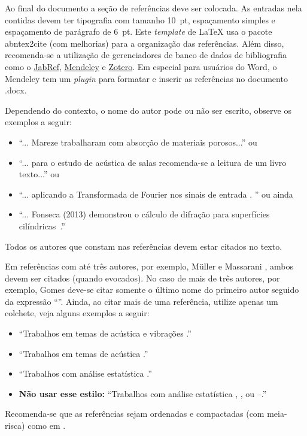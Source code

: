 \documentclass[12pt, a4paper, twoside, onecolumn]{article}
\begin{document}
Ao final do documento a seção de referências deve ser colocada. As entradas nela contidas devem ter tipografia com tamanho 10~pt, espaçamento simples e espaçamento de parágrafo de 6~pt. Este \textit{template} de \LaTeX\xspace usa o pacote {\ttfamily abntex2cite} (com melhorias) para a organização das referências. Além disso, recomenda-se a utilização de gerenciadores de banco de dados de bibliografia como o \href{http://www.jabref.org/}{JabRef}, \href{http://www.mendeley.com}{Mendeley} e \href{https://www.zotero.org/}{Zotero}. Em especial para usuários do Word, o Mendeley tem um \textit{plugin} para formatar e inserir as referências no documento .docx.


Dependendo do contexto, o nome do autor pode ou não ser escrito, observe os exemplos a seguir: 
%
\begin{itemize}[noitemsep,topsep=0ex] \itemsep=4pt
	\item 	``... Mareze \etal \cite{Mareze-2019} trabalharam com absorção de materiais porosos...'' ou 
	
	\item ``... para o estudo de acústica de salas \cite{Brandao-2017} recomenda-se a leitura de um livro texto...'' ou
	\item ``... aplicando a Transformada de Fourier nos sinais de entrada \cite{Oppenheim-2010}. '' ou ainda
	\item ``... Fonseca (2013) demonstrou o cálculo de difração para superfícies cilíndricas~\cite{Fonseca-2013}.''
\end{itemize}
%
Todos os autores que constam nas referências devem estar citados no texto.

Em referências com até três autores, por exemplo, Müller e Massarani \cite{Muller-2001}, ambos devem ser citados (quando evocados). No caso de mais de três autores, por exemplo, Gomes \etal \cite{Gomes-2015} deve-se citar somente o último nome do primeiro autor seguido da expressão ``\etal''. Ainda, ao citar mais de uma referência, utilize apenas um colchete, veja alguns exemplos a seguir:
%
\begin{itemize}[noitemsep,topsep=0ex] \itemsep=8pt
	\item ``Trabalhos em temas de acústica e vibrações \cite{Mareze-2017,Fonseca-2013,Brandao-2017}.''
	\item ``Trabalhos em temas de acústica \cite{Mareze-2017,Oppenheim-2010,Muller-2001,sobrac2018:natal, Mareze-2019, jasa:2022eac}.''
	\item ``Trabalhos com análise estatística \cite{Mareze-2017, Brandao-2017, aev:piccini2020}.''
		\item \textbf{Não usar esse estilo:} ``Trabalhos com análise estatística \cite{Mareze-2017}, \cite{Brandao-2017}, \cite{jasa:2022eac} ou \cite{Mareze-2017}--\cite{jasa:2022eac}.''
\end{itemize}
%
Recomenda-se que as referências sejam ordenadas e compactadas (com meia-risca) como em \cite{Mareze-2017,Oppenheim-2010,Muller-2001,Mareze-2019}.
\end{document}

